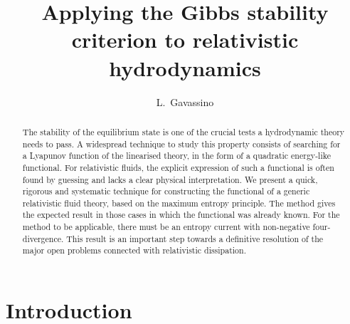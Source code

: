\documentclass[a4paper, amsfonts, amssymb, amsmath, reprint, showkeys, nofootinbib, twoside, onecolumn,notitlepage]{revtex4-1}
\begin{document}
\title{Applying the Gibbs stability criterion to relativistic hydrodynamics}
\author{L.~Gavassino}


\begin{abstract}
The stability of the equilibrium state is one of the crucial tests a hydrodynamic theory needs to pass. A widespread technique to study this property consists of searching for a Lyapunov function of the linearised theory, in the form of a quadratic energy-like functional. For relativistic fluids, the explicit expression of such a functional is often found by guessing and lacks a clear physical interpretation. We present a quick, rigorous and systematic technique for constructing the functional of a generic relativistic fluid theory, based on the maximum entropy principle. The method gives the expected result in those cases in which the functional was already known. For the method to be applicable, there must be an entropy current with non-negative four-divergence. This result is an important step towards a definitive resolution of the major open problems connected with relativistic dissipation.
\end{abstract} 



\maketitle

\section{Introduction} 
\end{document}

